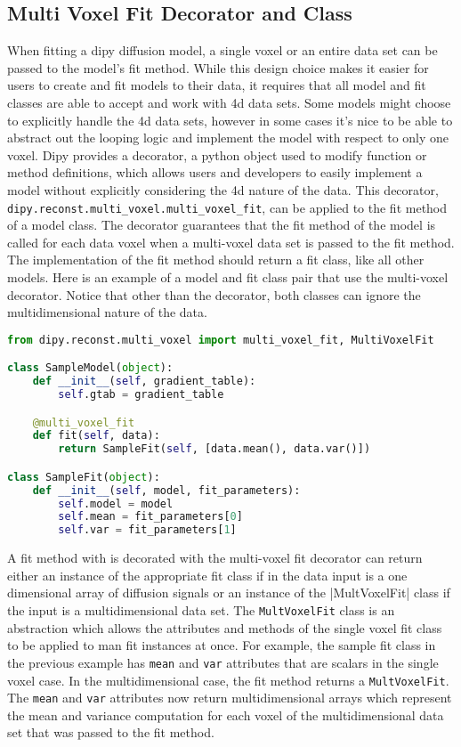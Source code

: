 \subsection{Multi Voxel Fit Decorator and Class}

When fitting a dipy diffusion model, a single voxel or an entire data set can be passed to the model's fit method. While this design choice makes it easier for users to create and fit models to their data, it requires that all model and fit classes are able to accept and work with 4d data sets. Some models might choose to explicitly handle the 4d data sets, however in some cases it's nice to be able to abstract out the looping logic and implement the model with respect to only one voxel. Dipy provides a decorator, a python object used to modify function or method definitions, which allows users and developers to easily implement a model without explicitly considering the 4d nature of the data. This decorator, \verb|dipy.reconst.multi_voxel.multi_voxel_fit|, can be applied to the fit method of a model class. The decorator guarantees that the fit method of the model is called for each data voxel when a multi-voxel data set is passed to the fit method. The implementation of the fit method should return a fit class, like all other models. Here is an example of a model and fit class pair that use the multi-voxel decorator. Notice that other than the decorator, both classes can ignore the multidimensional nature of the data.

\begin{lstlisting}[language=python]
from dipy.reconst.multi_voxel import multi_voxel_fit, MultiVoxelFit

class SampleModel(object):
    def __init__(self, gradient_table):
        self.gtab = gradient_table

    @multi_voxel_fit
    def fit(self, data):
        return SampleFit(self, [data.mean(), data.var()])

class SampleFit(object):
    def __init__(self, model, fit_parameters):
        self.model = model
        self.mean = fit_parameters[0]
        self.var = fit_parameters[1]
\end{lstlisting}

A fit method with is decorated with the multi-voxel fit decorator can return either an instance of the appropriate fit class if in the data input is a one dimensional array of diffusion signals or an instance of the \varb|MultVoxelFit| class if the input is a multidimensional data set. The \verb|MultVoxelFit| class is an abstraction which allows the attributes and methods of the single voxel fit class to be applied to man fit instances at once. For example, the sample fit class in the previous example has \verb|mean| and \verb|var| attributes that are scalars in the single voxel case. In the multidimensional case, the fit method returns a \verb|MultVoxelFit|. The \verb|mean| and \verb|var| attributes now return multidimensional arrays which represent the mean and variance computation for each voxel of the multidimensional data set that was passed to the fit method.

